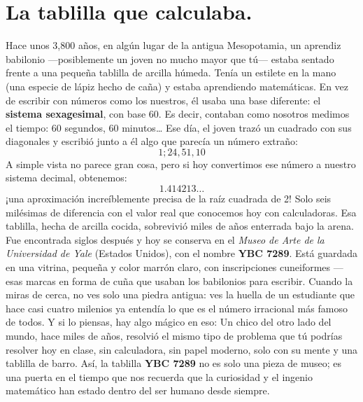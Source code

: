 
\vspace{0.5cm}

\vspace{1em}
\section*{La tablilla que calculaba.}

\begin{reseñaplana}
Hace unos 3{,}800 años, en algún lugar de la antigua Mesopotamia, un aprendiz babilonio —posiblemente 
un joven no mucho mayor que tú— estaba sentado frente a una pequeña tablilla de arcilla húmeda. 
Tenía un estilete en la mano (una especie de lápiz hecho de caña) y estaba aprendiendo matemáticas.
En vez de escribir con números como los nuestros, él usaba una base diferente: el \textbf{sistema sexagesimal}, 
con base 60. Es decir, contaban como nosotros medimos el tiempo: 60 segundos, 60 minutos…
Ese día, el joven trazó un cuadrado con sus diagonales y escribió junto a él algo que parecía un número extraño:
\[
1;24,51,10
\]
A simple vista no parece gran cosa, pero si hoy convertimos ese número a nuestro sistema decimal, obtenemos:
\[
1.414213\dots
\]
¡una aproximación increíblemente precisa de la raíz cuadrada de 2!
Solo seis milésimas de diferencia con el valor real que conocemos hoy con calculadoras.
Esa tablilla, hecha de arcilla cocida, sobrevivió miles de años enterrada bajo la arena. Fue encontrada siglos
después y hoy se conserva en el \textit{Museo de Arte de la Universidad de Yale} (Estados Unidos), con el 
nombre \textbf{YBC 7289}.
Está guardada en una vitrina, pequeña y color marrón claro, con inscripciones cuneiformes 
—esas marcas en forma de cuña que usaban los babilonios para escribir.
Cuando la miras de cerca, no ves solo una piedra antigua: ves la huella de un estudiante que hace casi cuatro 
milenios ya entendía lo que es el número irracional más famoso de todos.
Y si lo piensas, hay algo mágico en eso:
Un chico del otro lado del mundo, hace miles de años, resolvió el mismo tipo de problema que tú podrías 
resolver hoy en clase, sin calculadora, sin papel moderno, solo con su mente y una tablilla de barro.
Así, la tablilla \textbf{YBC 7289} no es solo una pieza de museo; es una puerta en el tiempo que nos recuerda 
que la curiosidad y el ingenio matemático han estado dentro del ser humano desde siempre.
\end{reseñaplana}

